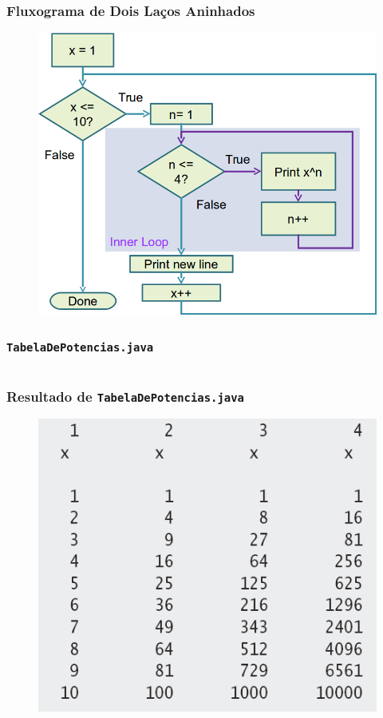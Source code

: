 \documentclass[xcolor={dvipsnames,table},aspectratio=169]{beamer}
\begin{document}
\begin{frame}\frametitle{Fluxograma de Dois Laços Aninhados}
\begin{figure}[h]
	\includegraphics[height=0.65\paperheight,center]{pucrs-ep-fprog-unidade_04-lacos-laminas-fluxograma_lacos_aninhados.png}
\end{figure}
\end{frame}

\begin{frame}[fragile]\frametitle{\texttt{TabelaDePotencias.java}}
\tiny{\inputminted[bgcolor=cyan!10]{java}{src/TabelaDePotencias.java}}
\end{frame}

\begin{frame}\frametitle{Resultado de \texttt{TabelaDePotencias.java}}
\begin{figure}[h]
	\includegraphics[height=0.65\paperheight,center]{pucrs-ep-fprog-unidade_04-lacos-laminas-resultado_de_powertable.png}
\end{figure}
\end{frame}
\end{document}
